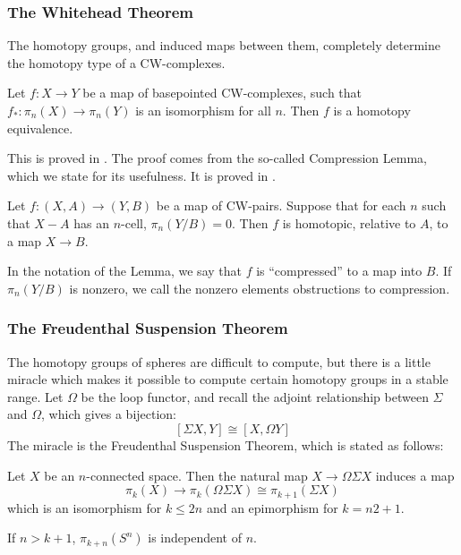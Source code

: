 \subsubsection{The Whitehead Theorem}
The homotopy groups, and induced maps between them, completely determine the homotopy type of a CW-complexes.  

\begin{Theorem}
  \label{sec:whthm}
  Let $f:X\to Y$ be a map of basepointed CW-complexes, such that $f_*:\pi_n(X)\to \pi_n(Y)$ is an isomorphism for all $n$.  Then $f$ is a homotopy equivalence.  
\end{Theorem}

This is proved in \cite[Thm~4.5]{HatcherAT}.  
The proof comes from the so-called Compression Lemma, which we state for its usefulness.  It is proved in \cite[Thm~4.6]{HatcherAT}.

\begin{Lemma}
  Let $f:(X,A)\to (Y,B)$ be a map of CW-pairs.  Suppose that for each $n$ such that $X-A$ has an $n$-cell, $\pi_n(Y/B)=0$.  Then $f$ is homotopic, relative to $A$, to a map $X\to B$.  
\end{Lemma}

\begin{Def}
  In the notation of the Lemma, we say that $f$ is ``compressed'' to a map into $B$.  If $\pi_n(Y/B)$ is nonzero, we call the nonzero elements obstructions to compression.  
\end{Def}

\subsubsection{The Freudenthal Suspension Theorem}

\label{sec:Freudenthal}

The homotopy groups of spheres are difficult to compute, but there is a little miracle which makes it possible to compute certain homotopy groups in a stable range.  
Let $\Omega$ be the loop functor, and recall the adjoint relationship between $\Sigma$ and $\Omega$, which gives a bijection:
\[[\Sigma X, Y]\cong[X, \Omega Y]\]
The miracle is the Freudenthal Suspension Theorem, which is stated as follows:
\begin{Theorem}
  Let $X$ be an $n$-connected space.  
  Then the natural map $X\to \Omega\Sigma X$ induces a map 
  \[\pi_k(X)\to \pi_k(\Omega\Sigma X)\cong\pi_{k+1}(\Sigma X)\]
  which is an isomorphism for $k\le 2n$ and an epimorphism for $k=n2+1$.  
\end{Theorem}
\begin{Cor}
  If $n>k+1$, $\pi_{k+n}(S^n)$ is independent of $n$.
\end{Cor}

